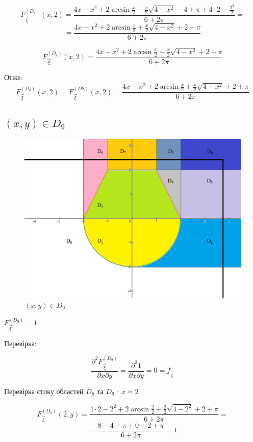 \documentclass[14pt, a4paper, ukrainian]{extreport}
\begin{document}
	$$ F_{\vec\xi}^{\left({D_4}\right)}(x, 2) = \frac{4x -x^2 + 2\arcsin\frac{x}{2} + \frac{x}{2}\sqrt{4-x^2} - 4 + \pi + 4\cdot 2 - \frac{2^2}{2}}{6+2\pi} = 
	$$
	$$ = \frac{4x -x^2 + 2\arcsin\frac{x}{2} + \frac{x}{2}\sqrt{4-x^2} + 2 + \pi }{6+2\pi}
	$$
	
	$$ F_{\vec\xi}^{\left({D_8}\right)}(x, 2) =  \frac{4x - x^2 + 2\arcsin\frac{x}{2} + \frac{x}{2}\sqrt{4-x^2} + 2 + \pi}{6+2\pi}
	$$
	
	Отже:	
	$$  F_{\vec\xi}^{\left({D_4}\right)}(x, 2) =  F_{\vec\xi}^{\left({D8}\right)}(x, 2) = \frac{4x - x^2 + 2\arcsin\frac{x}{2} + \frac{x}{2}\sqrt{4-x^2} + 2 + \pi}{6+2\pi}
	$$
	
	\subsection{$(x, y) \in D_9$}
	
	\begin{figure}[H]
		\centering
		\includegraphics[width=\textwidth]{./Image/Im_20_D_9.png}
		\caption{$(x, y) \in D_9$}
		\label{im:D_9}
	\end{figure}
	
	$F_{\vec \xi}^{\left(D_9\right)} = 1$
	
	Перевірка: 
	
	$$\frac{\partial^2F_{\vec\xi}^{\left(D_9\right)}}{\partial x \partial y} = \frac{\partial^2 1 }{\partial x \partial y} = 0 = f_{\vec{\xi}}
	$$
	
	Перевірка стику областей $D_8$ та $D_9$ : $ x = 2$ 
	
	$$ F_{\vec\xi}^{\left({D_8}\right)}(2, y) = \frac{4\cdot 2 -2^2 + 2\arcsin\frac{2}{2} + \frac{2}{2}\sqrt{4-2^2} + 2 + \pi }{6+2\pi} = 
	$$
	$$ = \frac{8 -4 + \pi + 0 + 2 + \pi }{6+2\pi} = 1
	$$
	
\end{document}
